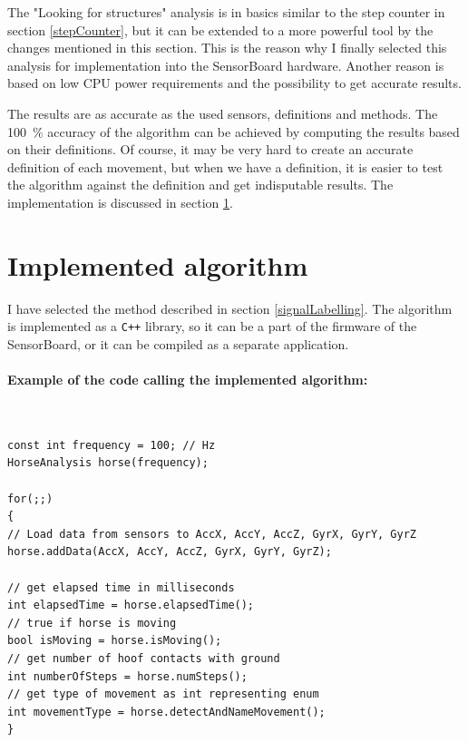 The "Looking for structures" analysis is in basics similar to the step counter in section \ref{stepCounter}, but it can be extended to a more powerful tool by the changes mentioned in this section. This is the reason why I finally selected this analysis for implementation into the SensorBoard hardware. Another reason is based on low \ac{CPU} power requirements and the possibility to get accurate results.

The results are as accurate as the used sensors, definitions and methods. The \SI{100}{\%} accuracy of the algorithm can be achieved by computing the results based on their definitions. Of course, it may be very hard to create an accurate definition of each movement, but when we have a definition, it is easier to test the algorithm against the definition and get indisputable results. The implementation is discussed in section \ref{implementedAnalysis}.

\section{Implemented algorithm}
\label{implementedAnalysis}
I have selected the method described in section \ref{signalLabelling}. The algorithm is implemented as a \texttt{C++} library, so it can be a part of the firmware of the SensorBoard, or it can be compiled as a separate application.

\paragraph{Example of the code calling the implemented algorithm:} \quad\\
\Cpp
\begin{lstlisting}
const int frequency = 100; // Hz
HorseAnalysis horse(frequency);

for(;;)
{
// Load data from sensors to AccX, AccY, AccZ, GyrX, GyrY, GyrZ
horse.addData(AccX, AccY, AccZ, GyrX, GyrY, GyrZ);

// get elapsed time in milliseconds
int elapsedTime = horse.elapsedTime();
// true if horse is moving
bool isMoving = horse.isMoving();
// get number of hoof contacts with ground
int numberOfSteps = horse.numSteps();
// get type of movement as int representing enum
int movementType = horse.detectAndNameMovement();
}
\end{lstlisting}

